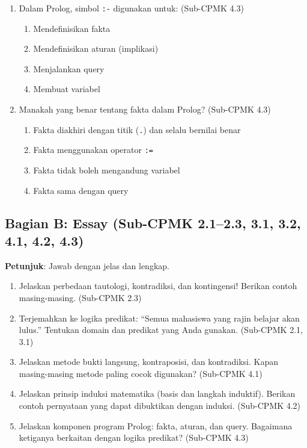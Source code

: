 \begin{enumerate}
  \item Dalam Prolog, simbol \texttt{:-} digunakan untuk: (Sub-CPMK 4.3)
  \begin{enumerate}
    \item Mendefinisikan fakta
    \item Mendefinisikan aturan (implikasi)
    \item Menjalankan query
    \item Membuat variabel
  \end{enumerate}
  
  \item Manakah yang benar tentang fakta dalam Prolog? (Sub-CPMK 4.3)
  \begin{enumerate}
    \item Fakta diakhiri dengan titik (\texttt{.}) dan selalu bernilai benar
    \item Fakta menggunakan operator \texttt{:=}
    \item Fakta tidak boleh mengandung variabel
    \item Fakta sama dengan query
  \end{enumerate}
\end{enumerate}

\subsection{Bagian B: Essay (Sub-CPMK 2.1--2.3, 3.1, 3.2, 4.1, 4.2, 4.3)}

\textbf{Petunjuk}: Jawab dengan jelas dan lengkap.

\begin{enumerate}
  \item Jelaskan perbedaan tautologi, kontradiksi, dan kontingensi! Berikan contoh masing-masing. (Sub-CPMK 2.3)
  \item Terjemahkan ke logika predikat: ``Semua mahasiswa yang rajin belajar akan lulus.'' Tentukan domain dan predikat yang Anda gunakan. (Sub-CPMK 2.1, 3.1)
  \item Jelaskan metode bukti langsung, kontraposisi, dan kontradiksi. Kapan masing-masing metode paling cocok digunakan? (Sub-CPMK 4.1)
  \item Jelaskan prinsip induksi matematika (basis dan langkah induktif). Berikan contoh pernyataan yang dapat dibuktikan dengan induksi. (Sub-CPMK 4.2)
  \item Jelaskan komponen program Prolog: fakta, aturan, dan query. Bagaimana ketiganya berkaitan dengan logika predikat? (Sub-CPMK 4.3)
\end{enumerate}

